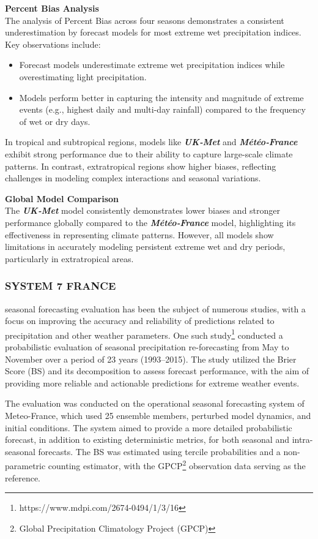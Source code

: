 \textbf{Percent Bias Analysis}\\
The analysis of Percent Bias across four seasons demonstrates a consistent underestimation by forecast models for most extreme wet precipitation indices. Key observations include:
\begin{itemize}
    \item Forecast models underestimate extreme wet precipitation indices while overestimating light precipitation.
    \item Models perform better in capturing the intensity and magnitude of extreme events (e.g., highest daily and multi-day rainfall) compared to the frequency of wet or dry days.
\end{itemize}

In tropical and subtropical regions, models like \textbf{\textit{UK‐Met}}  and \textbf{\textit{Météo‐France} } exhibit strong performance due to their ability to capture large-scale climate patterns. In contrast, extratropical regions show higher biases, reflecting challenges in modeling complex interactions and seasonal variations.

\textbf{Global Model Comparison}\\
The \textbf{\textit{UK‐Met}} model consistently demonstrates lower biases and stronger performance globally compared to the \textbf{\textit{Météo‐France} }  model, highlighting its effectiveness in representing climate patterns. However, all models show limitations in accurately modeling persistent extreme wet and dry periods, particularly in extratropical areas.


\subsubsection{SYSTEM 7 FRANCE}

seasonal forecasting evaluation has been the subject of numerous studies, with a focus on improving the accuracy and reliability of predictions related to precipitation and other weather parameters. One such study\footnote{https://www.mdpi.com/2674-0494/1/3/16} conducted a probabilistic evaluation of seasonal precipitation re-forecasting from May to November over a period of 23 years (1993–2015). The study utilized the Brier Score (BS) and its decomposition to assess forecast performance, with the aim of providing more reliable and actionable predictions for extreme weather events.

The evaluation was conducted on the operational seasonal forecasting system of Meteo-France, which used 25 ensemble members, perturbed model dynamics, and initial conditions. The system aimed to provide a more detailed probabilistic forecast, in addition to existing deterministic metrics, for both seasonal and intra-seasonal forecasts. The BS was estimated using tercile probabilities and a non-parametric counting estimator, with the GPCP\footnote{Global Precipitation Climatology Project (GPCP)} observation data serving as the reference.

